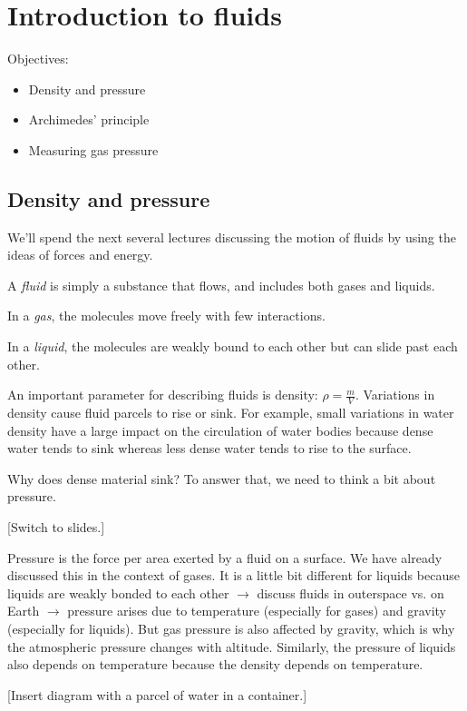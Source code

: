 \section{Introduction to fluids}
Objectives:
\begin{itemize}
\item Density and pressure
\item Archimedes' principle
\item Measuring gas pressure
\end{itemize}

\hrulefill

\subsection{Density and pressure}
We'll spend the next several lectures discussing the motion of fluids by using the ideas of forces and energy.

A \textit{fluid} is simply a substance that flows, and includes both gases and liquids.

In a \textit{gas}, the molecules move freely with few interactions.

In a \textit{liquid}, the molecules are weakly bound to each other but can slide past each other.

An important parameter for describing fluids is density: $\rho=\frac{m}{V}$. Variations in density cause fluid parcels to rise or sink. For example, small variations in water density have a large impact on the circulation of water bodies because dense water tends to sink whereas less dense water tends to rise to the surface.

Why does dense material sink? To answer that, we need to think a bit about pressure.

[Switch to slides.]

Pressure is the force per area exerted by a fluid on a surface. We have already discussed this in the context of gases. It is a little bit different for liquids because liquids are weakly bonded to each other $\rightarrow$ discuss fluids in outerspace vs. on Earth $\rightarrow$ pressure arises due to temperature (especially for gases) and gravity (especially for liquids). But gas pressure is also affected by gravity, which is why the atmospheric pressure changes with altitude. Similarly, the pressure of liquids also depends on temperature because the density depends on temperature.


[Insert diagram with a parcel of water in a container.]
\vspace{5cm}

